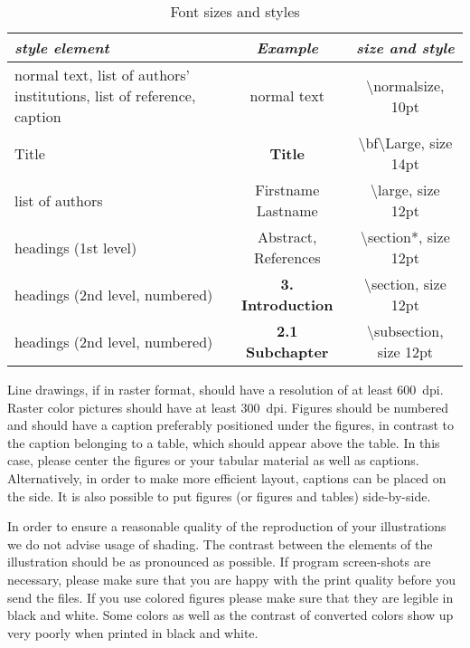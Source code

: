 \documentclass{mbd_fullpaper}
\begin{document}
\begin{table}[!ht]
  \begin{center}
    \caption{Font sizes and styles}
    \vspace{1mm}
    \begin{tabular}{|p{5cm}|c|c|}
      \hline
        {\it style element}&	{\it Example}&	{\it size and style}\\
      \hline
      \hline
        normal text, list of authors' institutions, list of reference, caption &	normal text&	\textbackslash normalsize, 10pt\\
      \hline
        Title&	{\bf\Large Title}&	\textbackslash bf\textbackslash Large, size 14pt\\
      \hline
        list of authors&	{\large Firstname Lastname}&	\textbackslash large, size 12pt\\
      \hline
        headings (1st level)& {\large	Abstract, References}&	 \textbackslash section*, size 12pt\\
      \hline
        headings (2nd level, numbered)&	{\bf\large 3. Introduction}&	\textbackslash section, size 12pt\\
      \hline
        headings (2nd level, numbered)& {\bf\large 2.1 Subchapter}&	\textbackslash subsection, size 12pt\\
      \hline
    \end{tabular}
    \label{tab:tab1}
  \end{center}
\end{table}

Line drawings, if in raster format, should have a resolution of at least 600~dpi. Raster color pictures should have at least 300~dpi. Figures should be numbered and should have a caption preferably positioned under the figures, in contrast to the caption belonging to a table, which should appear above the table. In this case, please center the figures or your tabular material as well as captions. Alternatively, in order to make more efficient layout, captions can be placed on the side. It is also possible to put figures (or figures and tables) side-by-side.

In order to ensure a reasonable quality of the reproduction of your illustrations we do not advise usage of shading. The contrast between the elements of the illustration should be as pronounced as possible. If program screen-shots are necessary, please make sure that you are happy with the print quality before you send the files. If you use colored figures please make sure that they are legible in black and white. Some colors as well as the contrast of converted colors show up very poorly when printed in black and white.
\end{document}
